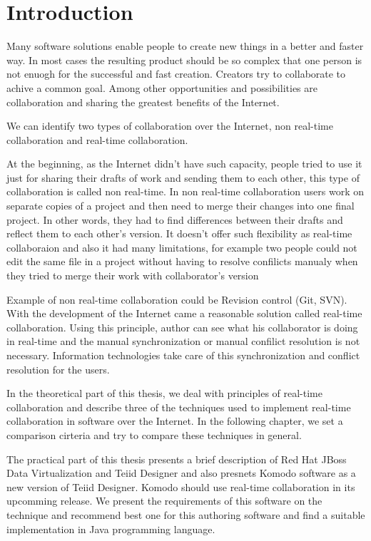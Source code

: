 \documentclass[12pt,oneside]{fithesis2}
\begin{document}
\chapter{Introduction} 
Many software solutions enable people to create new things in a better and faster way. In most cases the resulting product should be so complex that one person is not enuogh for the successful and fast creation. Creators try to collaborate to achive a common goal. Among other opportunities and possibilities are collaboration and sharing the greatest benefits of the Internet. \par
We can identify two types of collaboration over the Internet, non real-time collaboration and real-time collaboration. 
\par At the beginning, as the Internet didn't have such capacity, people tried to use it just for sharing their drafts of work and sending them to each other, this type of collaboration is called non real-time. In non real-time collaboration users work on separate copies of a project and then need to merge their changes into one final project. In other words, they had to find differences between their drafts and reflect them to each other's version. It doesn't offer such flexibility as real-time collaboraion and also it had many limitations, for example two people could not edit the same file in a project without having to resolve confilicts manualy when they tried to merge their work with collaborator's version\par
Example of non real-time collaboration could be Revision control (Git, SVN).
With the development of the Internet came a reasonable solution called real-time collaboration. Using this principle, author can see what his collaborator is doing in real-time and the manual synchronization or manual confilict resolution is not necessary. Information technologies take care of this synchronization and conflict resolution for the users.
\par In the theoretical part of this thesis, we deal with principles of real-time collaboration and describe three of the techniques used to implement real-time collaboration in software over the Internet. In the following chapter, we set a comparison cirteria and try to compare these techniques in general. 
\par The practical part of this thesis presents a brief description of Red Hat JBoss Data Virtualization and Teiid Designer and also presnets Komodo software as a new version of Teiid Designer. Komodo should use real-time collaboration in its upcomming release. We present the requirements of this software on the technique and recommend best one for this authoring software and find a suitable implementation in Java programming language.
\end{document}
